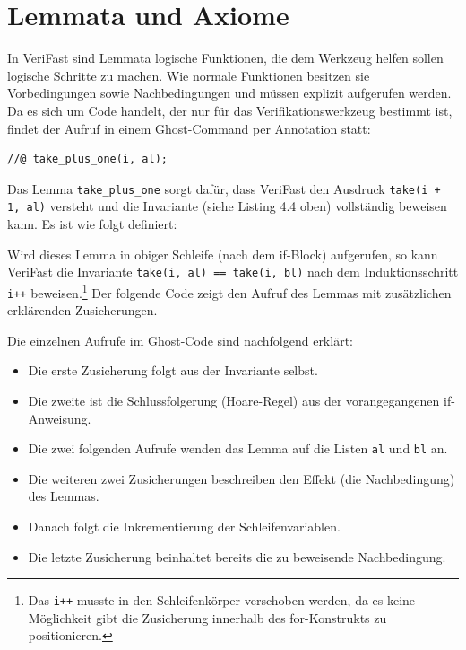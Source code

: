 \section{Lemmata und Axiome}
\label{verifizierung:lemma}

In VeriFast sind Lemmata logische Funktionen, die dem Werkzeug helfen sollen logische Schritte zu machen. Wie normale
Funktionen besitzen sie Vorbedingungen sowie Nachbedingungen und müssen explizit aufgerufen werden.
Da es sich um Code handelt, der nur für das Verifikationswerkzeug bestimmt ist, findet der Aufruf
in einem Ghost-Command per Annotation statt:

\lstset{frame=none}                      
\begin{lstlisting}
//@ take_plus_one(i, al);
\end{lstlisting}
\lstset{frame=single}    
Das Lemma \lstinline{take_plus_one} sorgt dafür, dass VeriFast den Ausdruck \lstinline{take(i + 1, al)}
versteht und die Invariante (siehe Listing 4.4 oben) vollständig beweisen kann. Es ist wie folgt
definiert:



Wird dieses Lemma in obiger Schleife (nach dem if-Block) aufgerufen, so kann VeriFast
die Invariante \lstinline{take(i, al) == take(i, bl)} nach dem Induktionsschritt \lstinline{i++}
beweisen.\footnote{Das 
\lstinline{i++} musste in den Schleifenkörper verschoben werden, da es keine  Möglichkeit gibt die Zusicherung 
innerhalb des for-Konstrukts zu positionieren.} Der folgende Code zeigt den Aufruf des Lemmas mit zusätzlichen erklärenden Zusicherungen.



Die einzelnen Aufrufe im Ghost-Code sind nachfolgend erklärt:
\begin{itemize}
\item Die erste Zusicherung folgt aus der Invariante selbst.
\item Die zweite ist die Schlussfolgerung (Hoare-Regel) aus der vorangegangenen if-Anweisung.
\item Die zwei folgenden Aufrufe wenden das Lemma auf die Listen \lstinline{al} und \lstinline{bl} an.
\item Die weiteren zwei Zusicherungen beschreiben den Effekt (die Nachbedingung) des Lemmas.
\item Danach folgt die Inkrementierung der Schleifenvariablen.
\item Die letzte Zusicherung beinhaltet bereits die zu beweisende Nachbedingung.
\end{itemize}

